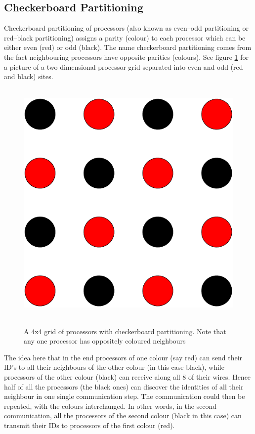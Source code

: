 \subsection{Checkerboard Partitioning}
Checkerboard partitioning of processors (also known as even--odd partitioning
or red--black partitioning) assigns a parity (colour) to each processor which
can be either even (red) or odd (black). The name checkerboard partitioning
comes from the fact neighbouring processors have opposite parities (colours).
See figure \ref{f:checkerboard_proc} for a picture of a two dimensional 
processor grid separated into even and odd (red and black) sites.
\begin{figure}[h]
\begin{center}
\leavevmode
\hbox{%
\includegraphics{checkerboard_proc}
}
\end{center}
\caption{A 4x4 grid of processors with checkerboard partitioning. Note that
any one processor has oppositely coloured neighbours}
\label{f:checkerboard_proc}
\end{figure}

The idea here that in the end processors of one colour (say red) can
send their ID's to all their neighbours of the other colour (in this
case black), while processors of the other colour (black) can receive
along all 8 of their wires. Hence half of all the processors (the
black ones) can discover the identities of all their neighbour in one
single communication step. The communication could then be repeated, with
the colours interchanged. In other words, in the second communication,
all the processors of the second colour (black in this case) can transmit
their IDs to processors of the first colour (red).

